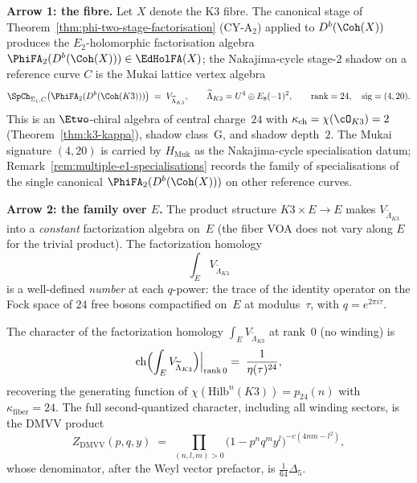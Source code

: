 \medskip
\noindent\textbf{Arrow 1: the fibre.} Let $X$ denote the K3 fibre. The canonical stage of Theorem~\ref{thm:phi-two-stage-factorisation} (CY-A$_2$) applied to
$D^b(\Coh(X))$ produces the $E_2$-holomorphic factorisation algebra
$\PhiFA_2(D^b(\Coh(X))) \in \EdHolFA(X)$; the Nakajima-cycle stage-$2$ shadow on a reference curve $C$ is the Mukai lattice vertex algebra
\begin{equation}\label{eq:phi2-k3-standalone}
 \SpCh_{\Sigma_1, C}\bigl(\PhiFA_2(D^b(\Coh(K3)))\bigr)
 \;=\;
 V_{\widetilde{\Lambda}_{K3}},
 \qquad
 \widetilde{\Lambda}_{K3} = U^4 \oplus E_8(-1)^2,
 \qquad
 \mathrm{rank} = 24,
 \quad
 \mathrm{sig} = (4,20).
\end{equation}
This is an $\Etwo$-chiral algebra of central charge~$24$ with
$\kappa_{\mathrm{ch}} = \chi(\cO_{K3}) = 2$
(Theorem~\ref{thm:k3-kappa}), shadow class~G, and shadow depth~$2$. The Mukai signature $(4, 20)$ is carried by $H_{\mathrm{Muk}}$ as the Nakajima-cycle specialisation datum; Remark~\ref{rem:multiple-e1-specialisations} records the family of specialisations of the single canonical $\PhiFA_2(D^b(\Coh(X)))$ on other reference curves.

\medskip
\noindent\textbf{Arrow 2: the family over $E$.} The product structure
$K3 \times E \to E$ makes $V_{\widetilde{\Lambda}_{K3}}$ into a
\emph{constant} factorization algebra on~$E$ (the fiber VOA does not
vary along $E$ for the trivial product). The factorization homology
\begin{equation}\label{eq:fact-hom-over-e-standalone}
 \int_E V_{\widetilde{\Lambda}_{K3}}
\end{equation}
is a well-defined \emph{number} at each $q$-power: the trace of the
identity operator on the Fock space of $24$ free bosons compactified
on~$E$ at modulus~$\tau$, with $q = e^{2\pi i\tau}$.

\begin{conjecture}
\label{conj:relative-fact-hom-char-standalone}
The character of the factorization homology
$\int_E V_{\widetilde{\Lambda}_{K3}}$ at rank~$0$ (no winding) is
\begin{equation}\label{eq:rank0-char-standalone}
 \operatorname{ch}\Bigl(\int_E V_{\widetilde{\Lambda}_{K3}}\Bigr)
 \Bigl|_{\mathrm{rank}\,0}
 \;=\;
 \frac{1}{\eta(\tau)^{24}},
\end{equation}
recovering the generating function of $\chi(\mathrm{Hilb}^n(K3)) = p_{24}(n)$
with $\kappa_{\mathrm{fiber}} = 24$. The full second-quantized character,
including all winding sectors, is the DMVV product
\begin{equation}\label{eq:dmvv-relative-standalone}
 Z_{\mathrm{DMVV}}(p, q, y)
 \;=\;
 \prod_{(n,l,m) > 0}
 \bigl(1 - p^n q^m y^l\bigr)^{-c(4nm - l^2)},
\end{equation}
whose denominator, after the Weyl vector prefactor, is
$\frac{1}{64}\Delta_5$.
\end{conjecture}

